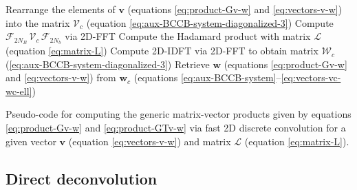 \begin{algorithm}
	Rearrange the elements of $\mathbf{v}$ (equations \ref{eq:product-Gv-w} and \ref{eq:vectors-v-w}) into the 
	matrix $\boldsymbol{\mathcal{V}}_{c}$ (equation \ref{eq:aux-BCCB-system-diagonalized-3})\; 
	Compute $\boldsymbol{\mathcal{F}}_{2N_{B}} \, \boldsymbol{\mathcal{V}}_{c} \, \boldsymbol{\mathcal{F}}_{2N_{b}}$ via 2D-FFT\;
	Compute the Hadamard product with matrix $\boldsymbol{\mathcal{L}}$ (equation \ref{eq:matrix-L})\;
	Compute 2D-IDFT via 2D-FFT to obtain matrix $\boldsymbol{\mathcal{W}}_{c}$ (\ref{eq:aux-BCCB-system-diagonalized-3})\;
	Retrieve $\mathbf{w}$ (equations \ref{eq:product-Gv-w} and \ref{eq:vectors-v-w}) from $\mathbf{w}_{c}$
	(equations \ref{eq:aux-BCCB-system}--\ref{eq:vectors-vc-wc-ell})\;
	\caption{Pseudo-code for computing the generic matrix-vector products given by equations \ref{eq:product-Gv-w} 
		and \ref{eq:product-GTv-w} via fast 2D discrete convolution for a given vector $\mathbf{v}$ (equation \ref{eq:vectors-v-w}) 
		and matrix $\boldsymbol{\mathcal{L}}$ (equation \ref{eq:matrix-L}).}
	\label{alg:fast-2D-convolution}
\end{algorithm}

\subsection{Direct deconvolution}

